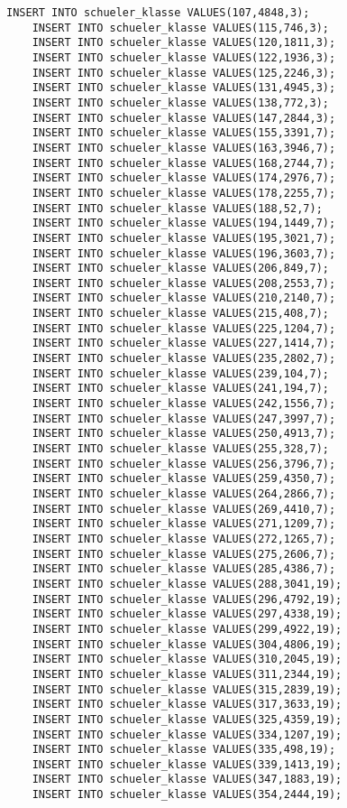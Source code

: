 \begin{lstlisting}[breaklines=True, numbers=none, basicstyle=\tiny, keepspaces=false]
	INSERT INTO schueler_klasse VALUES(107,4848,3);
	INSERT INTO schueler_klasse VALUES(115,746,3);
	INSERT INTO schueler_klasse VALUES(120,1811,3);
	INSERT INTO schueler_klasse VALUES(122,1936,3);
	INSERT INTO schueler_klasse VALUES(125,2246,3);
	INSERT INTO schueler_klasse VALUES(131,4945,3);
	INSERT INTO schueler_klasse VALUES(138,772,3);
	INSERT INTO schueler_klasse VALUES(147,2844,3);
	INSERT INTO schueler_klasse VALUES(155,3391,7);
	INSERT INTO schueler_klasse VALUES(163,3946,7);
	INSERT INTO schueler_klasse VALUES(168,2744,7);
	INSERT INTO schueler_klasse VALUES(174,2976,7);
	INSERT INTO schueler_klasse VALUES(178,2255,7);
	INSERT INTO schueler_klasse VALUES(188,52,7);
	INSERT INTO schueler_klasse VALUES(194,1449,7);
	INSERT INTO schueler_klasse VALUES(195,3021,7);
	INSERT INTO schueler_klasse VALUES(196,3603,7);
	INSERT INTO schueler_klasse VALUES(206,849,7);
	INSERT INTO schueler_klasse VALUES(208,2553,7);
	INSERT INTO schueler_klasse VALUES(210,2140,7);
	INSERT INTO schueler_klasse VALUES(215,408,7);
	INSERT INTO schueler_klasse VALUES(225,1204,7);
	INSERT INTO schueler_klasse VALUES(227,1414,7);
	INSERT INTO schueler_klasse VALUES(235,2802,7);
	INSERT INTO schueler_klasse VALUES(239,104,7);
	INSERT INTO schueler_klasse VALUES(241,194,7);
	INSERT INTO schueler_klasse VALUES(242,1556,7);
	INSERT INTO schueler_klasse VALUES(247,3997,7);
	INSERT INTO schueler_klasse VALUES(250,4913,7);
	INSERT INTO schueler_klasse VALUES(255,328,7);
	INSERT INTO schueler_klasse VALUES(256,3796,7);
	INSERT INTO schueler_klasse VALUES(259,4350,7);
	INSERT INTO schueler_klasse VALUES(264,2866,7);
	INSERT INTO schueler_klasse VALUES(269,4410,7);
	INSERT INTO schueler_klasse VALUES(271,1209,7);
	INSERT INTO schueler_klasse VALUES(272,1265,7);
	INSERT INTO schueler_klasse VALUES(275,2606,7);
	INSERT INTO schueler_klasse VALUES(285,4386,7);
	INSERT INTO schueler_klasse VALUES(288,3041,19);
	INSERT INTO schueler_klasse VALUES(296,4792,19);
	INSERT INTO schueler_klasse VALUES(297,4338,19);
	INSERT INTO schueler_klasse VALUES(299,4922,19);
	INSERT INTO schueler_klasse VALUES(304,4806,19);
	INSERT INTO schueler_klasse VALUES(310,2045,19);
	INSERT INTO schueler_klasse VALUES(311,2344,19);
	INSERT INTO schueler_klasse VALUES(315,2839,19);
	INSERT INTO schueler_klasse VALUES(317,3633,19);
	INSERT INTO schueler_klasse VALUES(325,4359,19);
	INSERT INTO schueler_klasse VALUES(334,1207,19);
	INSERT INTO schueler_klasse VALUES(335,498,19);
	INSERT INTO schueler_klasse VALUES(339,1413,19);
	INSERT INTO schueler_klasse VALUES(347,1883,19);
	INSERT INTO schueler_klasse VALUES(354,2444,19);

\end{lstlisting}
